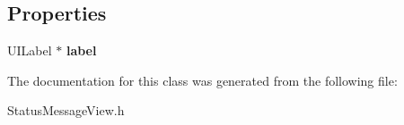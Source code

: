 \subsection*{Properties}
\begin{DoxyCompactItemize}
\item 
\hypertarget{interface_status_message_view_a59274d2166a46a55d28ad8464cb2837f}{U\-I\-Label $\ast$ {\bfseries label}}\label{interface_status_message_view_a59274d2166a46a55d28ad8464cb2837f}

\end{DoxyCompactItemize}


The documentation for this class was generated from the following file\-:\begin{DoxyCompactItemize}
\item 
Status\-Message\-View.\-h\end{DoxyCompactItemize}
